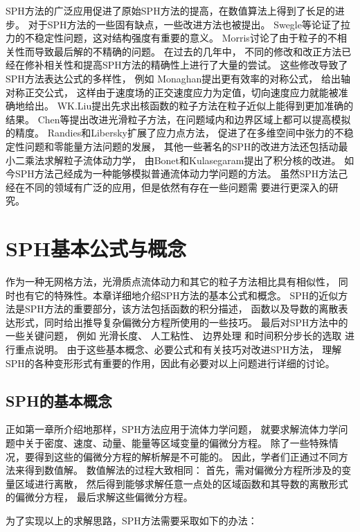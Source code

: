 SPH方法的广泛应用促进了原始SPH方法的提高，在数值算法上得到了长足的进步。
对于SPH方法的一些固有缺点，一些改进方法也被提出。
Swegle等论证了拉力的不稳定性问题，这对结构强度有重要的意义。
Morris讨论了由于粒子的不相关性而导致最后解的不精确的问题。
在过去的几年中，
不同的修改和改正方法已经在修补相关性和提高SPH方法的精确性上进行了大量的尝试。
这些修改导致了SPH方法表达公式的多样性，
例如
Monaghan提出更有效率的对称公式，
\citeauthor{Johnson1996NORMALIZED}
给出轴对称正交公式，
这样由于速度场的正交速度应力为定值，切向速度应力就能被准确地给出。
WK.Liu提出先求出核函数的粒子方法在粒子近似上能得到更加准确的结果。
Chen等提出改进光滑粒子方法，在问题域内和边界区域上都可以提高模拟的精度。
Randies和Libersky扩展了应力点方法，
促进了在多维空间中张力的不稳定性问题和零能量方法问题的发展， 
其他一些著名的SPH的改进方法还包括动最小二乘法求解粒子流体动力学，
由Bonet和Kulasegaram提出了积分核的改进。
如今SPH方法己经成为一种能够模拟普通流体动力学问题的方法。
虽然SPH方法己经在不同的领域有广泛的应用，但是依然有存在一些问题需
要进行更深入的研究。

\chapter{SPH基本公式与概念}
\label{chap:sph-base-equ}

\qquad{}作为一种无网格方法，光滑质点流体动力和其它的粒子方法相比具有相似性，
同时也有它的特殊性。本章详细地介绍SPH方法的基本公式和概念。
SPH的近似方法是SPH方法的重要部分，该方法包括函数的积分描述，
函数以及导数的离散表达形式，同时给出推导复杂偏微分方程所使用的一些技巧。
最后对SPH方法中的一些关键问题，
例如
光滑长度、
人工粘性、
边界处理
和时间积分步长的选取
进行重点说明。
由于这些基本概念、必要公式和有关技巧对改进SPH方法，
理解SPH的各种变形形式有重要的作用，因此有必要对以上问题进行详细的讨论。

\section{SPH的基本概念}
\label{sec:sph-base-conc}

正如第一章所介绍地那样，SPH方法应用于流体力学问题，
就要求解流体力学问题中关于密度、速度、动量、能量等区域变量的偏微分方程。
除了一些特殊情况，要得到这些的偏微分方程的解析解是不可能的。
因此，学者们正通过不同方法来得到数值解。
数值解法的过程大致相同：
首先，需对偏微分方程所涉及的变量区域进行离散，
然后得到能够求解任意一点处的区域函数和其导数的离散形式的偏微分方程，
最后求解这些偏微分方程。

为了实现以上的求解思路，SPH方法需要采取如下的办法：

